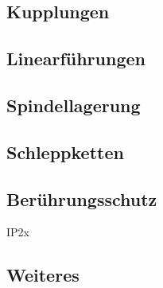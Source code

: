 \subsection{Kupplungen}

\subsection{Linearführungen}

\subsection{Spindellagerung}

\subsection{Schleppketten}

\subsection{Berührungsschutz}
IP2x
	
\subsection{Weiteres}
